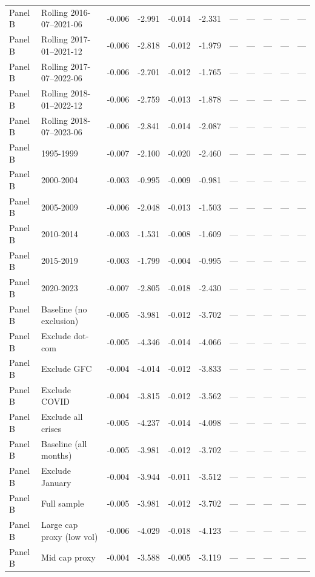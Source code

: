 \begin{longtable}{lllrrrrrrrl}
Panel B & Rolling 2016-07–2021-06 & -0.006 & -2.991 & -0.014 & -2.331 & — & — & — & — & — \\
Panel B & Rolling 2017-01–2021-12 & -0.006 & -2.818 & -0.012 & -1.979 & — & — & — & — & — \\
Panel B & Rolling 2017-07–2022-06 & -0.006 & -2.701 & -0.012 & -1.765 & — & — & — & — & — \\
Panel B & Rolling 2018-01–2022-12 & -0.006 & -2.759 & -0.013 & -1.878 & — & — & — & — & — \\
Panel B & Rolling 2018-07–2023-06 & -0.006 & -2.841 & -0.014 & -2.087 & — & — & — & — & — \\
Panel B & 1995-1999 & -0.007 & -2.100 & -0.020 & -2.460 & — & — & — & — & — \\
Panel B & 2000-2004 & -0.003 & -0.995 & -0.009 & -0.981 & — & — & — & — & — \\
Panel B & 2005-2009 & -0.006 & -2.048 & -0.013 & -1.503 & — & — & — & — & — \\
Panel B & 2010-2014 & -0.003 & -1.531 & -0.008 & -1.609 & — & — & — & — & — \\
Panel B & 2015-2019 & -0.003 & -1.799 & -0.004 & -0.995 & — & — & — & — & — \\
Panel B & 2020-2023 & -0.007 & -2.805 & -0.018 & -2.430 & — & — & — & — & — \\
Panel B & Baseline (no exclusion) & -0.005 & -3.981 & -0.012 & -3.702 & — & — & — & — & — \\
Panel B & Exclude dot-com & -0.005 & -4.346 & -0.014 & -4.066 & — & — & — & — & — \\
Panel B & Exclude GFC & -0.004 & -4.014 & -0.012 & -3.833 & — & — & — & — & — \\
Panel B & Exclude COVID & -0.004 & -3.815 & -0.012 & -3.562 & — & — & — & — & — \\
Panel B & Exclude all crises & -0.005 & -4.237 & -0.014 & -4.098 & — & — & — & — & — \\
Panel B & Baseline (all months) & -0.005 & -3.981 & -0.012 & -3.702 & — & — & — & — & — \\
Panel B & Exclude January & -0.004 & -3.944 & -0.011 & -3.512 & — & — & — & — & — \\
Panel B & Full sample & -0.005 & -3.981 & -0.012 & -3.702 & — & — & — & — & — \\
Panel B & Large cap proxy (low vol) & -0.006 & -4.029 & -0.018 & -4.123 & — & — & — & — & — \\
Panel B & Mid cap proxy & -0.004 & -3.588 & -0.005 & -3.119 & — & — & — & — & — \\

\end{longtable}
